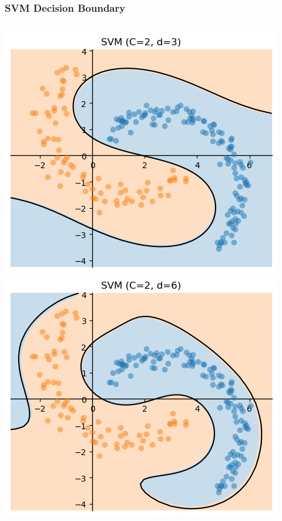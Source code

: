 \documentclass[10pt,aspectratio=169,handout]{beamer}
\begin{document}
\begin{frame}
    \frametitle{SVM Decision Boundary}

    \begin{columns}
        \begin{column}{0.3\textwidth}
            \centering
            \includegraphics[height=0.4\textheight]{images/task5-4-d_3.png}
            \includegraphics[height=0.4\textheight]{images/task5-4-d_6.png}
        \end{column}
        \begin{column}{0.3\textwidth}
            \centering

\end{column}
\end{columns}
\end{frame}
\end{document}
